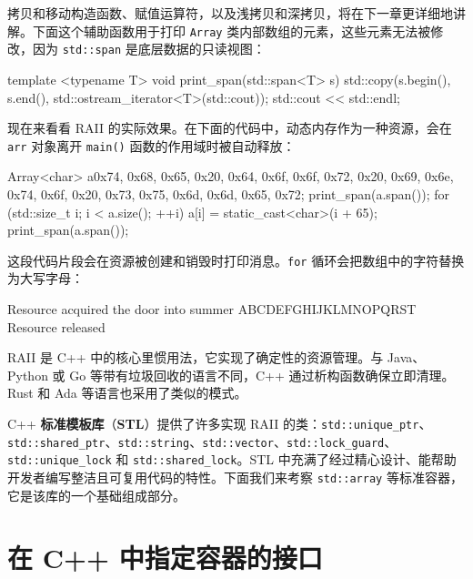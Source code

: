 拷贝和移动构造函数、赋值运算符，以及浅拷贝和深拷贝，将在下一章更详细地讲解。下面这个辅助函数用于打印 \texttt{Array} 类内部数组的元素，这些元素无法被修改，因为 \texttt{std::span} 是底层数据的只读视图：

\begin{codebox}[cpp]
template <typename T> void print_span(std::span<T> s) {
    std::copy(s.begin(), s.end(), std::ostream_iterator<T>(std::cout));
    std::cout << std::endl;
}
\end{codebox}

现在来看看 RAII 的实际效果。在下面的代码中，动态内存作为一种资源，会在 \texttt{arr} 对象离开 \texttt{main()} 函数的作用域时被自动释放：

\begin{codebox}[cpp]
Array<char> a{0x74, 0x68, 0x65, 0x20, 0x64, 0x6f, 0x6f, 0x72, 0x20, 0x69, 0x6e, 0x74, 0x6f, 0x20, 0x73, 0x75, 0x6d, 0x6d, 0x65, 0x72};
print_span(a.span());
for (std::size_t i{}; i < a.size(); ++i) {
    a[i] = static_cast<char>(i + 65);
}
print_span(a.span());
\end{codebox}

这段代码片段会在资源被创建和销毁时打印消息。\texttt{for} 循环会把数组中的字符替换为大写字母：

\begin{codebox}[text]
Resource acquired
the door into summer
ABCDEFGHIJKLMNOPQRST
Resource released
\end{codebox}

\label{idx:436}
RAII 是 C++ 中的核心里惯用法，它实现了确定性的资源管理。与 Java、Python 或 Go 等带有垃圾回收的语言不同，C++ 通过析构函数确保立即清理。Rust 和 Ada 等语言也采用了类似的模式。

\label{idx:437}
C++ \textbf{标准模板库}（\textbf{STL}）提供了许多实现 RAII 的类：\texttt{std::\allowbreak{}unique\_\allowbreak{}ptr}、\texttt{std::\allowbreak{}shared\_\allowbreak{}ptr}、\texttt{std::\allowbreak{}string}、\texttt{std::\allowbreak{}vector}、\texttt{std::\allowbreak{}lock\_\allowbreak{}guard}、\texttt{std::\allowbreak{}unique\_\allowbreak{}lock} 和 \texttt{std::\allowbreak{}shared\_\allowbreak{}lock}。STL 中充满了经过精心设计、能帮助开发者编写整洁且可复用代码的特性。下面我们来考察 \texttt{std::\allowbreak{}array} 等标准容器，它是该库的一个基础组成部分。

\section{在 C++ 中指定容器的接口}

